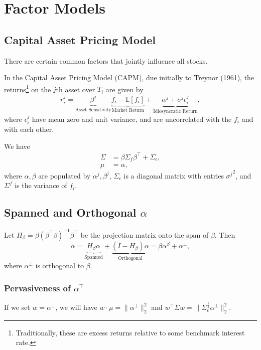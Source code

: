 \documentclass{article}
\newcommand{\sectionquote}[1]{\def\insertsquote{#1}}
\newcommand{\insertsquote}{}
\renewcommand{\insertsquote}{}%
\begin{document}
\sectionquote{``Every researcher has their own research process. This is part of their competitive advantage; it's indeed part of what they are, of thoughts and learned lessons accumulated over a lifetime of experiences and studying.'' Giuseppe Paleologo}
\section{Factor Models}
\subsection{Capital Asset Pricing Model}
There are certain common factors that jointly influence all stocks.

In the Capital Asset Pricing Model (CAPM), due initially to Treynor (1961), the returns\footnote{Traditionally, these are excess returns relative to some benchmark interest rate.} on the $j$th asset over $T_i$ are given by
$$r_i^j = \underbrace{\beta^j}_{\textrm{Asset Sensitivity}} \underbrace{f_i-\mathbb{E}[f_i]}_{\textrm{Market Return}} + \underbrace{\alpha^j + \sigma^j\epsilon_i^j}_{\textrm{Idiosyncratic Return}},$$ 
where $\epsilon_i^j$ have mean zero and unit variance, and are uncorrelated with the $f_i$ and with each other.

We have
\begin{align*}
	\Sigma	&= \beta \Sigma_f \beta^\top + \Sigma_\epsilon,
\\	\mu	&= \alpha,
\end{align*}
where $\alpha,\beta$ are populated by $\alpha^j,\beta^j$, $\Sigma_\epsilon$ is a diagonal matrix with entries ${\sigma^j}^2$, and $\Sigma^f$ is the variance of $f_i$.

\subsection{Spanned and Orthogonal $\alpha$}
Let $H_\beta=\beta (\beta^\top \beta)^{-1}\beta^\top$ be the projection matrix onto the span of $\beta$. Then
$$\alpha = \underbrace{H_\beta\alpha}_{\textrm{Spanned}} + \underbrace{(I-H_\beta) \alpha}_{\textrm{Orthogonal}} = \beta \alpha^\beta + \alpha^\bot,$$
where $\alpha^\bot$ is orthogonal to $\beta$.

\subsubsection{Pervasiveness of $\alpha^\top$}
If we set $w = \alpha^\bot$, we will have $w\cdot\mu = \|\alpha^\bot\|_2^2$ and $w^\top\Sigma w = \|\Sigma_\epsilon^\frac{1}{2} \alpha^\bot\|_2^2$.
\end{document}
